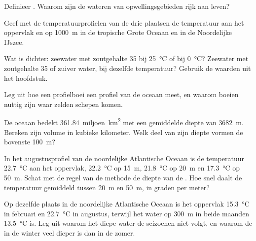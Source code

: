 \begin{exercise}[$\star$]\label{exo:g10:layered-ocean:2}
Definieer . Waarom zijn de wateren van opwellingsgebieden rijk aan leven?
\end{exercise}

\begin{exercise}[$\star$]\label{exo:g10:layered-ocean:3}
Geef met de temperatuurprofielen van de drie plaatsen de temperatuur aan het
oppervlak en op \qty{1000}{m} in de tropische Grote Oceaan en in de Noordelijke
IJszee.
\end{exercise}

\begin{exercise}[$\star$]\label{exo:g10:layered-ocean:4}
Wat is dichter: zeewater met zoutgehalte 35 bij \qty{25}{\degreeCelsius} of bij
\qty{0}{\degreeCelsius}? Zeewater met zoutgehalte 35 of zuiver water, bij
dezelfde temperatuur? Gebruik de waarden uit het hoofdstuk.
\end{exercise}

\begin{exercise}[$\star$]\label{exo:g10:layered-ocean:5}
Leg uit hoe een profielboei een profiel van de oceaan meet, en waarom boeien
nuttig zijn waar zelden schepen komen.
\end{exercise}

\begin{exercise}[$\star\star$]\label{exo:g10:layered-ocean:6}
De oceaan bedekt \num{361.84}~miljoen~\unit{km^2} met een gemiddelde diepte van
\qty{3682}{m}. Bereken zijn volume in kubieke kilometer. Welk deel van zijn
diepte vormen de bovenste \qty{100}{m}?
\end{exercise}

\begin{exercise}[$\star\star$]\label{exo:g10:layered-ocean:7}
In het augustusprofiel van de noordelijke Atlantische Oceaan is de temperatuur
\qty{22.7}{\degreeCelsius} aan het oppervlak, \qty{22.2}{\degreeCelsius} op
\qty{15}{m}, \qty{21.8}{\degreeCelsius} op \qty{20}{m} en
\qty{17.3}{\degreeCelsius} op \qty{50}{m}. Schat met de regel van de methode de
diepte van de . Hoe snel daalt de temperatuur gemiddeld tussen
\qty{20}{m} en \qty{50}{m}, in graden per meter?
\end{exercise}

\begin{exercise}[$\star\star$]\label{exo:g10:layered-ocean:8}
Op dezelfde plaats in de noordelijke Atlantische Oceaan is het oppervlak
\qty{15.3}{\degreeCelsius} in februari en \qty{22.7}{\degreeCelsius} in
augustus, terwijl het water op \qty{300}{m} in beide maanden
\qty{13.5}{\degreeCelsius} is. Leg uit waarom het diepe water de seizoenen niet
volgt, en waarom de  in de winter veel dieper is dan in de zomer.
\end{exercise}

